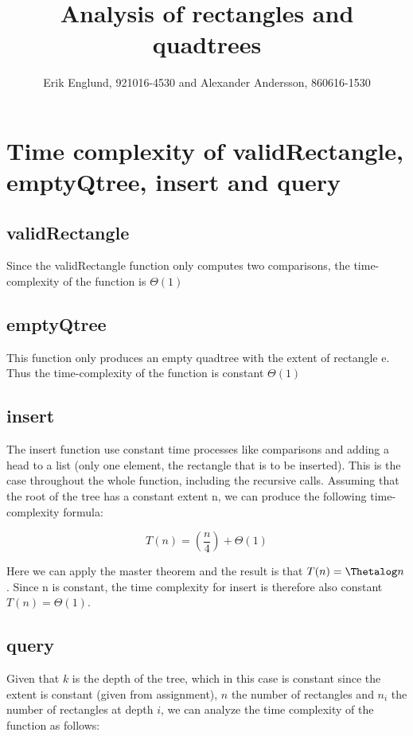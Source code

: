 \documentclass[12pt, a4paper]{article}
\title{Analysis of rectangles and quadtrees}
\author{Erik Englund, 921016-4530 and Alexander Andersson, 860616-1530}
\begin{document}
\maketitle

\section{Time complexity of validRectangle, emptyQtree, insert and query}

\subsection{validRectangle}

Since the validRectangle function only computes two comparisons, the time-complexity of the function is 
$\Theta(1)$




\subsection{emptyQtree}

This function only produces an empty quadtree with the extent of rectangle e. Thus the time-complexity of the function is constant $\Theta(1)$



\subsection{insert}

The insert function use constant time processes like comparisons and adding a head to a list (only one element, the rectangle that is to be inserted). This is the case throughout the whole function, including the recursive calls. Assuming that the root of the tree has a constant extent n, we can produce the following time-complexity formula:

$$T(n)=\left(\frac{n}{4}\right)+\Theta(1)$$

Here we can apply the master theorem and the result is that $T(n)=\Thetalog n$. Since n is constant, the time complexity for insert is therefore also constant $T(n) = \Theta(1)$.



\subsection{query}


Given that $k$ is the depth of the tree, which in this case is constant since the extent is constant (given from assignment), $n$ the number of rectangles and $n_i$ the number of rectangles at depth $i$, we can analyze the time complexity of the function as follows:
\end{document}
